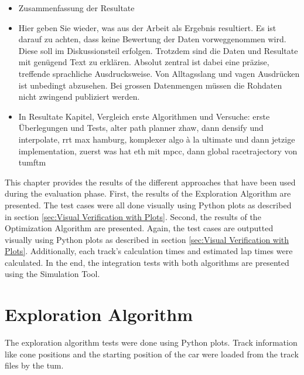 \begin{itemize}
    \item Zusammenfassung der Resultate
    \item Hier geben Sie wieder, was aus der Arbeit als Ergebnis resultiert. Es ist darauf zu achten, dass keine Bewertung der Daten vorweggenommen wird. Diese soll im Diskussionsteil erfolgen. Trotzdem sind die Daten und Resultate mit genügend Text zu erklären. Absolut zentral ist dabei eine präzise, treffende sprachliche Ausdrucksweise. Von Alltagsslang und vagen Ausdrücken ist unbedingt abzusehen. Bei grossen Datenmengen müssen die Rohdaten nicht zwingend publiziert werden.
    \item In Resultate Kapitel, Vergleich erste Algorithmen und Versuche: erste Überlegungen und Tests, alter path planner zhaw, dann densify und interpolate, rrt max hamburg, komplexer algo à la ultimate und dann jetzige implementation, zuerst was hat eth mit mpcc, dann global racetrajectory von tumftm
\end{itemize}

This chapter provides the results of the different approaches that have been used during the evaluation phase. First, the results of the Exploration Algorithm are presented. The test cases were all done visually using Python plots as described in section \ref{sec:Visual Verification with Plots}. Second, the results of the Optimization Algorithm are presented. Again, the test cases are outputted visually using Python plots as described in section \ref{sec:Visual Verification with Plots}. Additionally, each track's calculation times and estimated lap times were calculated. In the end, the integration tests with both algorithms are presented using the Simulation Tool.

\section{Exploration Algorithm}
The exploration algorithm tests were done using Python plots. Track information like cone positions and the starting position of the car were loaded from the track files by the \acrlong{tum}. \cite{tumftm_optimization_algoritm}


